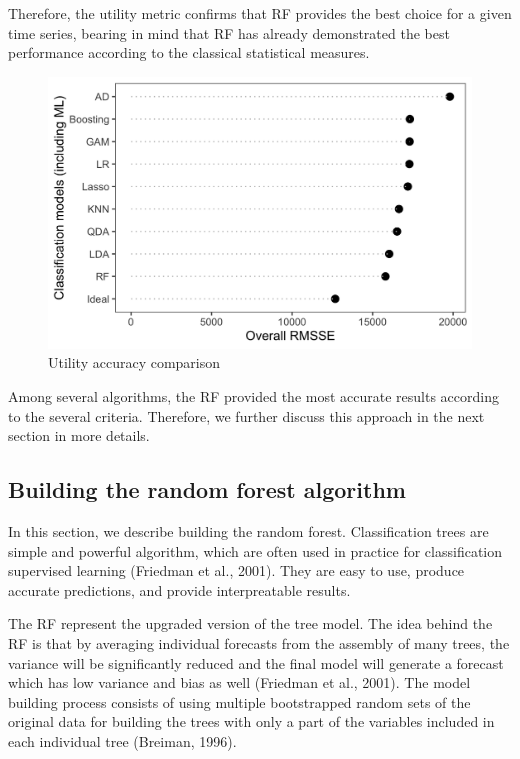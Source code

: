 \documentclass[]{elsarticle} %
\begin{document}
Therefore, the utility metric confirms that RF provides the best choice
for a given time series, bearing in mind that RF has already
demonstrated the best performance according to the classical statistical
measures.

\begin{figure}[H]

{\centering \includegraphics[width=0.6\linewidth]{img/300dpi/utility} 

}

\caption{Utility accuracy comparison}\label{fig:tableCB}
\end{figure}

Among several algorithms, the RF provided the most accurate results
according to the several criteria. Therefore, we further discuss this
approach in the next section in more details.

\hypertarget{building-the-random-forest-algorithm}{%
\subsection{Building the random forest
algorithm}\label{building-the-random-forest-algorithm}}

In this section, we describe building the random forest. Classification
trees are simple and powerful algorithm, which are often used in
practice for classification supervised learning (Friedman et al., 2001).
They are easy to use, produce accurate predictions, and provide
interpreatable results.

The RF represent the upgraded version of the tree model. The idea behind
the RF is that by averaging individual forecasts from the assembly of
many trees, the variance will be significantly reduced and the final
model will generate a forecast which has low variance and bias as well
(Friedman et al., 2001). The model building process consists of using
multiple bootstrapped random sets of the original data for building the
trees with only a part of the variables included in each individual tree
(Breiman, 1996).
\end{document}
